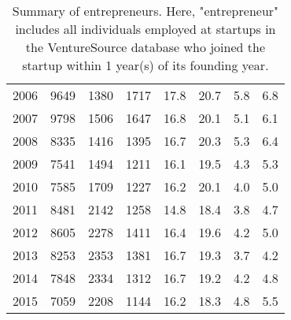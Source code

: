 \begin{table}[!htb]
\begin{tabular}{p{1.75cm}p{1.75cm}p{1.75cm}p{1.75cm}p{1.75cm}p{1.75cm}p{1.75cm}p{1.75cm}}
  2006 & 9649 & 1380 & 1717 & 17.8 & 20.7 & 5.8 & 6.8 \\ 
  2007 & 9798 & 1506 & 1647 & 16.8 & 20.1 & 5.1 & 6.1 \\ 
  2008 & 8335 & 1416 & 1395 & 16.7 & 20.3 & 5.3 & 6.4 \\ 
  2009 & 7541 & 1494 & 1211 & 16.1 & 19.5 & 4.3 & 5.3 \\ 
  2010 & 7585 & 1709 & 1227 & 16.2 & 20.1 & 4.0 & 5.0 \\ 
  2011 & 8481 & 2142 & 1258 & 14.8 & 18.4 & 3.8 & 4.7 \\ 
  2012 & 8605 & 2278 & 1411 & 16.4 & 19.6 & 4.2 & 5.0 \\ 
  2013 & 8253 & 2353 & 1381 & 16.7 & 19.3 & 3.7 & 4.2 \\ 
  2014 & 7848 & 2334 & 1312 & 16.7 & 19.2 & 4.2 & 4.8 \\ 
  2015 & 7059 & 2208 & 1144 & 16.2 & 18.3 & 4.8 & 5.5 \\ 
   \bottomrule
\end{tabular}
\endgroup
\caption{Summary of entrepreneurs. Here, "entrepreneur" includes all individuals employed at startups in the VentureSource database who joined the startup within 1 year(s) of its founding year.} 
\end{table}
